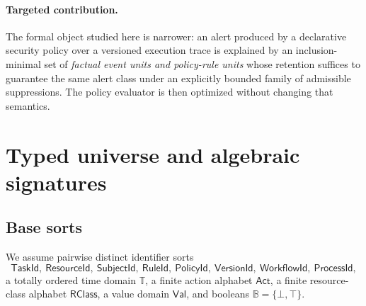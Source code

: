 \documentclass[11pt]{article}
\theoremstyle{remark}
\newcommand{\Bool}{\mathbb{B}}
\begin{document}
\paragraph{Targeted contribution.}
The formal object studied here is narrower: an alert produced by a declarative security policy over a versioned execution trace is explained by an inclusion-minimal set of \emph{factual event units and policy-rule units} whose retention suffices to guarantee the same alert class under an explicitly bounded family of admissible suppressions. The policy evaluator is then optimized without changing that semantics.

\section{Typed universe and algebraic signatures}

\subsection{Base sorts}
We assume pairwise distinct identifier sorts
\[
\mathsf{TaskId},\ \mathsf{ResourceId},\ \mathsf{SubjectId},\ \mathsf{RuleId},\ \mathsf{PolicyId},\ \mathsf{VersionId},\ \mathsf{WorkflowId},\ \mathsf{ProcessId},
\]
a totally ordered time domain $\mathbb{T}$, a finite action alphabet $\mathsf{Act}$, a finite resource-class alphabet $\mathsf{RClass}$, a value domain $\mathsf{Val}$, and booleans $\Bool=\{\bot,\top\}$.
\end{document}
